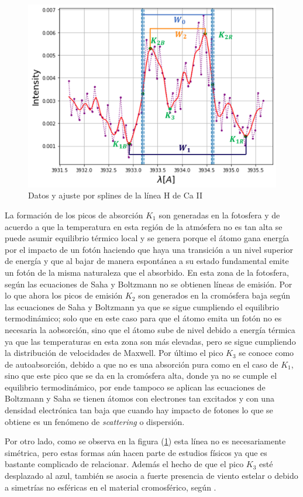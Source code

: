 \documentclass[12pt,oneside,openany,letter]{book}
\begin{document}
\begin{figure}[h]
    \centering
    \includegraphics[width=0.8\linewidth]{Images/lineaCaii.png}
    \caption{Datos y ajuste por splines de la línea H de Ca II}
    \label{fig:lineaCaii}
\end{figure}

\noindent La formación de los picos de absorción $K_1$ son generadas en la fotosfera y de acuerdo a que la temperatura en esta región de la atmósfera no es tan alta se puede asumir equilibrio térmico local y se genera porque el átomo gana energía por el impacto de un fotón haciendo que haya una transición a un nivel superior de energía y que al bajar de manera espontánea a su estado fundamental emite un fotón de la misma naturaleza que el absorbido. En esta zona de la fotosfera, según las ecuaciones de Saha y Boltzmann no se obtienen líneas de emisión. Por lo que ahora los picos de emisión $K_2$ son generados en la cromósfera baja según las ecuaciones de Saha y Boltzmann ya que se sigue cumpliendo el equilibrio termodinámico; solo que en este caso para que el átomo emita un fotón no es necesaria la aobsorción, sino que el átomo sube de nivel debido a energía térmica ya que las temperaturas en esta zona son más elevadas, pero se sigue cumpliendo la distribución de velocidades de Maxwell. Por último el pico $K_3$ se conoce como de autoabsorción, debido a que no es una absorción pura como en el caso de $K_1$, sino que este pico que se da en la cromósfera alta, donde ya no se cumple el equilibrio termodinámico, por ende tampoco se aplican las ecuaciones de Boltzmann y Saha se tienen átomos con electrones tan excitados y con una densidad electrónica tan baja que cuando hay impacto de fotones lo que se obtiene es un fenómeno de \textit{scattering} o dispersión.

\noindent Por otro lado, como se observa en la figura (\ref{fig:lineaCaii}) esta línea no es necesariamente simétrica, pero estas formas aún hacen parte de estudios físicos ya que es bastante complicado de relacionar. Además el hecho de que el pico $K_3$ esté desplazado al azul, también se asocia a fuerte presencia de viento estelar o debido a simetrías no esféricas en el material cromosférico, según \citep{linsky1980stellar}.
\end{document}
